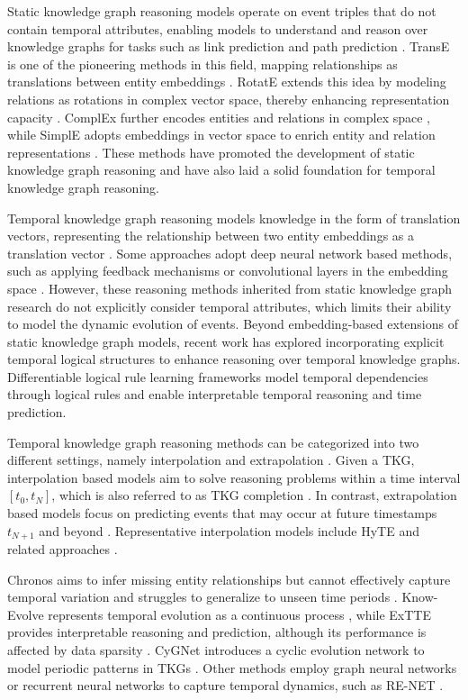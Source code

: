 \documentclass[11pt]{article}
\begin{document}
Static knowledge graph reasoning models operate on event triples that do not contain temporal attributes, enabling models to understand and reason over knowledge graphs for tasks such as link prediction and path prediction \citep{bordes2013translating}. TransE is one of the pioneering methods in this field, mapping relationships as translations between entity embeddings \citep{bordes2013translating}. RotatE extends this idea by modeling relations as rotations in complex vector space, thereby enhancing representation capacity \citep{sun2019rotate}. ComplEx further encodes entities and relations in complex space \citep{trouillon2016complex}, while SimplE adopts embeddings in vector space to enrich entity and relation representations \citep{kazemi2018simple}. These methods have promoted the development of static knowledge graph reasoning and have also laid a solid foundation for temporal knowledge graph reasoning.

Temporal knowledge graph reasoning models knowledge in the form of translation vectors, representing the relationship between two entity embeddings as a translation vector \citep{leblay2018deriving}. Some approaches adopt deep neural network based methods, such as applying feedback mechanisms or convolutional layers in the embedding space \citep{jin2020recurrent}. However, these reasoning methods inherited from static knowledge graph research do not explicitly consider temporal attributes, which limits their ability to model the dynamic evolution of events.
Beyond embedding-based extensions of static knowledge graph models, 
recent work has explored incorporating explicit temporal logical structures 
to enhance reasoning over temporal knowledge graphs. 
Differentiable logical rule learning frameworks \citep{xiongtilp, xiong2024teilp} model temporal dependencies 
through logical rules and enable interpretable temporal reasoning and time prediction.

Temporal knowledge graph reasoning methods can be categorized into two different settings, namely interpolation and extrapolation \citep{xu2020temporal}. Given a TKG, interpolation based models aim to solve reasoning problems within a time interval $[t_0, t_N]$, which is also referred to as TKG completion \citep{leblay2018deriving}. In contrast, extrapolation based models focus on predicting events that may occur at future timestamps $t_{N+1}$ and beyond \citep{trivedi2017know}. Representative interpolation models include HyTE and related approaches \citep{dasgupta2018hyte}.

Chronos aims to infer missing entity relationships but cannot effectively capture temporal variation and struggles to generalize to unseen time periods \citep{sadeghian2021chronos}. Know-Evolve represents temporal evolution as a continuous process \citep{trivedi2017know}, while ExTTE provides interpretable reasoning and prediction, although its performance is affected by data sparsity \citep{xu2020temporal}. CyGNet introduces a cyclic evolution network to model periodic patterns in TKGs \citep{zhu2021cygnet}. Other methods employ graph neural networks or recurrent neural networks to capture temporal dynamics, such as RE-NET \citep{jin2020recurrent}.
\end{document}
